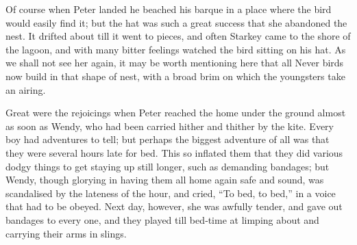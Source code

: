 Of course when Peter landed he beached his barque in a place where the bird would easily find it;
but the hat was such a great success that she abandoned the nest.
It drifted about till it went to pieces,
and often Starkey came to the shore of the lagoon,
and with many bitter feelings watched the bird sitting on his hat.
As we shall not see her again,
it may be worth mentioning here that all Never birds now build in that shape of nest,
with a broad brim on which the youngsters take an airing.

Great were the rejoicings when Peter reached the home under the ground almost as soon as Wendy,
who had been carried hither and thither by the kite.
Every boy had adventures to tell;
but perhaps the biggest adventure of all was that they were several hours late for bed.
This so inflated them that they did various dodgy things to get staying up still longer,
such as demanding bandages;
but Wendy, though glorying in having them all home again safe and sound,
was scandalised by the lateness of the hour,
and cried, “To bed, to bed,” in a voice that had to be obeyed.
Next day, however, she was awfully tender,
and gave out bandages to every one,
and they played till bed‐time at limping about and carrying their arms in slings.

\endinput
